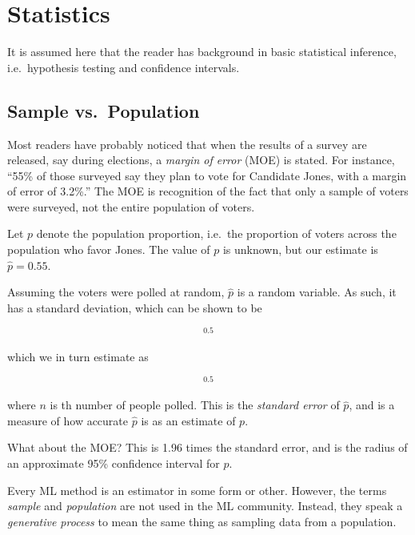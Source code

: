 \chapter{Statistics}
\label{chap:stat}



It is assumed here that the reader has background in basic statistical
inference, i.e.\ hypothesis testing and confidence intervals.

\section{Sample vs.\ Population}

Most readers have probably noticed that when the results of a survey are
released, say during elections, a \textit{margin of error} (MOE) is stated.
For instance, ``55\% of those surveyed say they plan to vote for
Candidate Jones, with a margin of error of 3.2\%.''  The MOE is
recognition of the fact that only a sample of voters were surveyed, not
the entire population of voters.

Let $p$ denote the population proportion, i.e.\ the proportion of voters
across the population who favor Jones.  The value of $p$ is unknown, but
our estimate is $\widehat{p} = 0.55$.

Assuming the voters were polled at random, $\widehat{p}$ is a random
variable.  As such, it has a standard deviation, which can be shown to
be

\begin{equation}
[p(1-p)/n] ^{0.5}
\end{equation}

which we in turn estimate as

\begin{equation}
[\widehat{p}(1-\widehat{p})/n] ^{0.5}
\end{equation}

where $n$ is th number of people polled.  This is the \textit{standard
error} of $\widehat{p}$, and is a measure of how accurate $\widehat{p}$
is as an estimate of $p$.

What about the MOE?  This is 1.96 times the standard error, and is the
radius of an approximate 95\% confidence interval for $p$.

Every ML method is an estimator in some form or other.  However,
the terms \textit{sample} and \textit{population} are not used in the ML
community.  Instead, they speak a \textit{generative process} to mean
the same thing as sampling data from a population.

